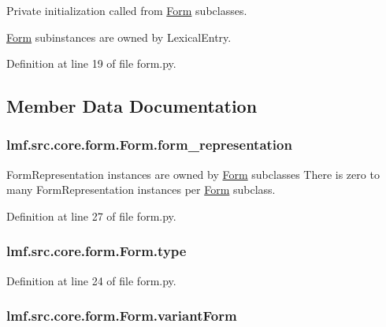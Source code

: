 Private initialization called from \hyperlink{classlmf_1_1src_1_1core_1_1form_1_1_form}{Form} subclasses. 

\hyperlink{classlmf_1_1src_1_1core_1_1form_1_1_form}{Form} subinstances are owned by Lexical\+Entry. 

Definition at line 19 of file form.\+py.



\subsection{Member Data Documentation}
\hypertarget{classlmf_1_1src_1_1core_1_1form_1_1_form_a81a147d40e70054d06b4ad90fd523a8f}{
\subsubsection[{form\+\_\+representation}]{\setlength{\rightskip}{0pt plus 5cm}lmf.\+src.\+core.\+form.\+Form.\+form\+\_\+representation}}\label{classlmf_1_1src_1_1core_1_1form_1_1_form_a81a147d40e70054d06b4ad90fd523a8f}


Form\+Representation instances are owned by \hyperlink{classlmf_1_1src_1_1core_1_1form_1_1_form}{Form} subclasses There is zero to many Form\+Representation instances per \hyperlink{classlmf_1_1src_1_1core_1_1form_1_1_form}{Form} subclass. 



Definition at line 27 of file form.\+py.

\hypertarget{classlmf_1_1src_1_1core_1_1form_1_1_form_ae8b8836cc3f78314dfb3a416ff95cac8}{
\subsubsection[{type}]{\setlength{\rightskip}{0pt plus 5cm}lmf.\+src.\+core.\+form.\+Form.\+type}}\label{classlmf_1_1src_1_1core_1_1form_1_1_form_ae8b8836cc3f78314dfb3a416ff95cac8}


Definition at line 24 of file form.\+py.

\hypertarget{classlmf_1_1src_1_1core_1_1form_1_1_form_a601549e93d6bd00ba5d8d3467a12bcdb}{
\subsubsection[{variant\+Form}]{\setlength{\rightskip}{0pt plus 5cm}lmf.\+src.\+core.\+form.\+Form.\+variant\+Form}}\label{classlmf_1_1src_1_1core_1_1form_1_1_form_a601549e93d6bd00ba5d8d3467a12bcdb}


